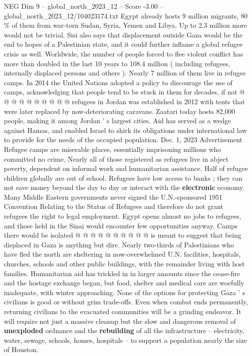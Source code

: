 \begin{textsample}{NEG Dim 9 – global\_north\_2023\_12 – Score -3.00 – global\_north\_2023\_12/104023174.txt}
Egypt already hosts 9 million migrants, 80 \% of them from war-torn Sudan, Syria, Yemen and Libya.
Up to 2.3 million more would not be trivial.
Sisi also says that displacement outside Gaza would be the end to hopes of a Palestinian state, and it could further inflame a global refugee crisis as well.
Worldwide, the number of people forced to flee violent conflict has more than doubled in the last 10 years to 108.4 million ( including refugees, internally displaced persons and others ).
Nearly 7 million of them live in refugee camps.
In 2014 the United Nations adopted a policy to discourage the use of camps, acknowledging that people tend to be stuck in them for decades, if not @ @ @ @ @ @ @ @ @ @ refugees in Jordan was established in 2012 with tents that were later replaced by now-deteriorating caravans.
Zaatari today hosts 82,000 people, making it among Jordan ' s largest cities.
Aid has served as a wedge against Hamas, and enabled Israel to shirk its obligations under international law to provide for the needs of the occupied population.
Dec. 1, 2023 Advertisement Refugee camps are miserable places, essentially imprisoning millions who committed no crime.
Nearly all of those registered as refugees live in abject poverty, dependent on informal work and humanitarian assistance.
Half of refugee children globally are out of school.
Refugees have low access to banks ; they can not save money beyond the day to day or interact with the \textbf{electronic} economy.
Many Middle Eastern governments never signed the U.N.-sponsored 1951 Convention Relating to the Status of Refugees and therefore do not grant refugees the right to legal employment.
Egypt opens almost no jobs to refugees, and those held in the Sinai would encounter few opportunities anyway.
Camps there would be isolated @ @ @ @ @ @ @ @ @ @ is meant to suggest that being displaced in Gaza is anything but dire.
Nearly two-thirds of Palestinians who have fled the north are sheltering in now-overwhelmed U.N. facilities, hospitals, churches, schools and other public buildings, with the remainder living with host families.
Humanitarian aid has trickled in in larger amounts since the cease-fire and the hostage exchange began, but food, shelter and medical care are woefully inadequate, with winter approaching.
None of the options for protecting Gaza ' s civilians is good or without grim trade-offs.
Even when combat ends permanently, returning civilians to the evacuated communities will be a grinding endeavor.
It will require not just a massive cleanup but the slow and dangerous removal of \textbf{unexploded} ordnance and the \textbf{rebuilding} of all the infrastructure -- electricity, water, sewage, schools, homes, hospitals -- to support a population nearly the size of Houston.

\end{textsample}
